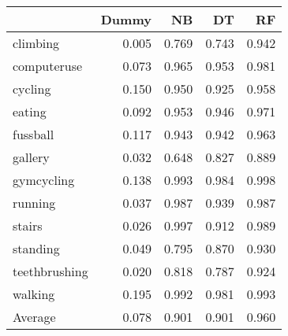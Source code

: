 \begin{tabular}{lrrrr}
\toprule
{} &  Dummy &    NB &    DT &    RF \\
\midrule
climbing      &  0.005 & 0.769 & 0.743 & 0.942 \\
computeruse   &  0.073 & 0.965 & 0.953 & 0.981 \\
cycling       &  0.150 & 0.950 & 0.925 & 0.958 \\
eating        &  0.092 & 0.953 & 0.946 & 0.971 \\
fussball      &  0.117 & 0.943 & 0.942 & 0.963 \\
gallery       &  0.032 & 0.648 & 0.827 & 0.889 \\
gymcycling    &  0.138 & 0.993 & 0.984 & 0.998 \\
running       &  0.037 & 0.987 & 0.939 & 0.987 \\
stairs        &  0.026 & 0.997 & 0.912 & 0.989 \\
standing      &  0.049 & 0.795 & 0.870 & 0.930 \\
teethbrushing &  0.020 & 0.818 & 0.787 & 0.924 \\
walking       &  0.195 & 0.992 & 0.981 & 0.993 \\
Average       &  0.078 & 0.901 & 0.901 & 0.960 \\
\bottomrule
\end{tabular}
